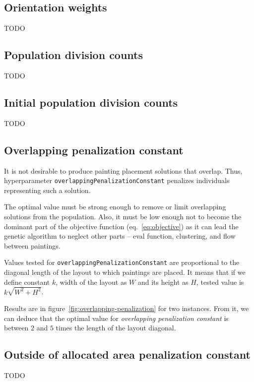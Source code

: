 \subsection{Orientation weights}\label{subsec:orientation-weights}
TODO

\subsection{Population division counts}\label{subsec:population-division-counts}
TODO

\subsection{Initial population division counts}\label{subsec:initial-population-division-counts}
TODO

\subsection{Overlapping penalization constant}\label{subsec:overlapping-penalization-constant}

It is not desirable to produce painting placement solutions that overlap.
Thus, hyperparameter \verb|overlappingPenalizationConstant| penalizes
individuals representing such a solution.

The optimal value must be strong enough to remove or limit overlapping solutions from the population.
Also, it must be low enough not to become the dominant part of the objective function (eq.~\ref{eq:objective})
as it can lead the genetic algorithm to neglect other parts – eval function, clustering, and flow between paintings.

Values tested for \verb|overlappingPenalizationConstant| are proportional to the diagonal
length of the layout to which paintings are placed.
It means that if we define constant $k$, width of the layout as $W$ and its height as $H$,
tested value is $k\sqrt{W^2 + H^2}$.

Results are in figure~\ref{fig:overlapping-penalization} for two instances.
From it, we can deduce that the optimal value for \textit{overlapping penalization constant} is between $2$ and $5$ times the length of the layout diagonal.

\subsection{Outside of allocated area penalization constant}\label{subsec:outside-of-allocated-area-penalization-constant}
TODO

